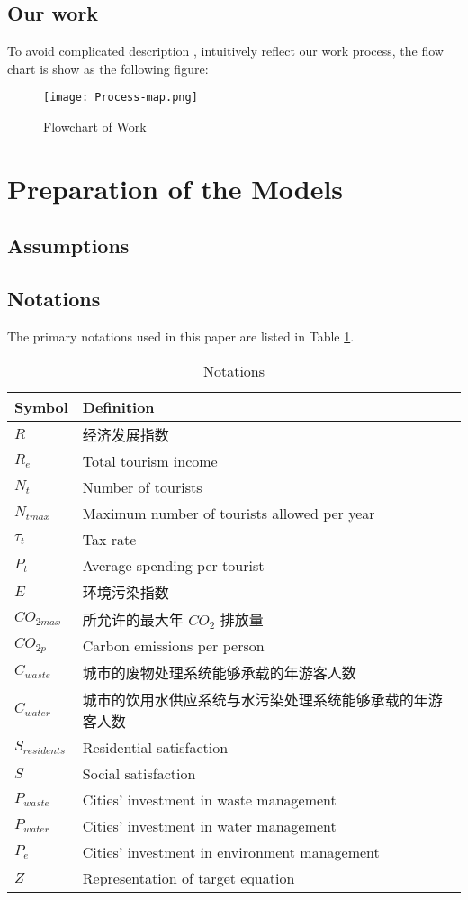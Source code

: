 \documentclass[12pt]{article}  %
\begin{document}
\subsection{Our work}
To avoid complicated description , intuitively reflect our work process, the flow chart is show
as the following figure:
\begin{figure}[H]
	\centering
	\texttt{[image: Process-map.png]}
	\caption{Flowchart of Work}\label{fig:Process-map}
\end{figure}

\section{Preparation of the Models}
\subsection{Assumptions}

\subsection{Notations}
The primary notations used in this paper are listed in Table \ref{tb:notation}.

\begin{table}[H]
\begin{center}
\caption{Notations}
\begin{tabular}{>{\centering\arraybackslash}m{4cm} >{\centering\arraybackslash}m{10cm}}
	\toprule
		Symbol & Definition \\
	\midrule
		\(R\) & 经济发展指数 \\
	    \(R_{e}\) & Total tourism income \\
		\(N_{t}\) & Number of tourists \\
		\(N_{tmax}\) & Maximum number of tourists allowed per year \\
		\(\tau_{t}\) & Tax rate \\
		\(P_{t}\) & Average spending per tourist \\
		\(E\) & 环境污染指数 \\
		\(CO_{2max}\) & 所允许的最大年 \(CO_{2}\) 排放量 \\
		\(CO_{2p}\) & Carbon emissions per person \\
		\(C_{waste}\) & 城市的废物处理系统能够承载的年游客人数 \\
		\(C_{water}\) & 城市的饮用水供应系统与水污染处理系统能够承载的年游客人数 \\
		\(S_{residents}\) & Residential satisfaction \\
		\(S\) & Social satisfaction \\
		\(P_{waste}\) & Cities' investment in waste management \\
		\(P_{water}\) & Cities' investment in water management \\
		\(P_{e}\) & Cities' investment in environment management \\
		\(Z\) & Representation of target equation\\
	\bottomrule
\end{tabular}\label{tb:notation}
\end{center}
\end{table}
\end{document}
